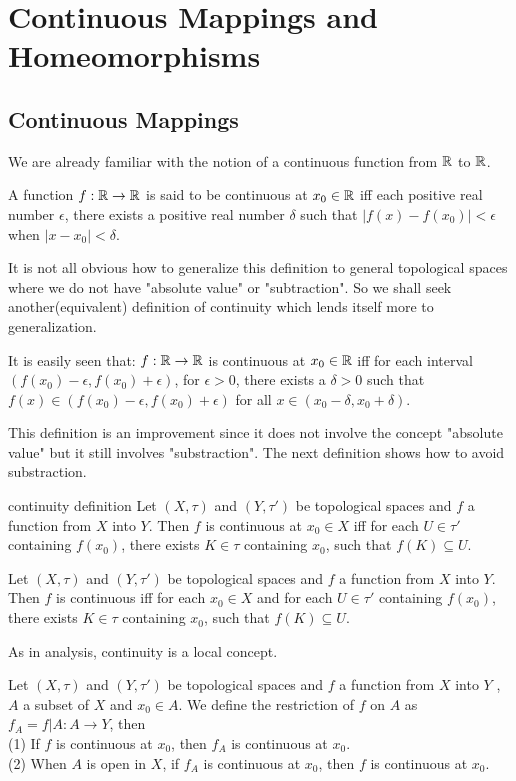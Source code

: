 \chapter{Continuous Mappings and Homeomorphisms}\label{1_2}

\section{Continuous Mappings}
We are already familiar with the notion of a continuous function from $\mathbb{R}$ to $\mathbb{R}$.
\par
A function $f:\mathbb{R}\rightarrow \mathbb{R}$ is said to be continuous at $x_0\in \mathbb{R}$ iff each positive real number $\epsilon$, 
there exists a positive real number $\delta$ such that $|f(x)-f(x_0)|<\epsilon$ when $|x-x_0|<\delta$. 
\par
It is not all obvious how to generalize this definition to general topological spaces where we do not have 
"absolute value" or "subtraction". So we shall seek another(equivalent) definition of continuity which lends itself more to 
generalization. 

It is easily seen that: $f:\mathbb{R}\rightarrow \mathbb{R}$ is continuous at $x_0\in\mathbb{R}$ iff for each interval $(f(x_0)-\epsilon, f(x_0)+\epsilon)$, 
for $\epsilon>0$, there exists a $\delta>0$ such that $f(x)\in(f(x_0)-\epsilon, f(x_0)+\epsilon)$ for all $x\in(x_0-\delta,x_0+\delta)$.
\par
This definition is an improvement since it does not involve the concept "absolute value" but it still involves "substraction". 
The next definition shows how to avoid substraction.

\begin{definition}{}{continuity definition}
    Let $(X,\tau)$ and $(Y,\tau')$ be topological spaces and $f$ a function from $X$ into $Y$.
    Then $f$ is continuous at $x_0\in X$ iff
    for each $U\in \tau'$ containing $f(x_0)$, there exists $K\in\tau$ containing $x_0$, such that $f(K)\subseteq U$.
\end{definition}

\begin{definition}{}{}
    Let $(X,\tau)$ and $(Y,\tau')$ be topological spaces and $f$ a function from $X$ into $Y$.
    Then $f$ is continuous iff for each $x_0\in X$ and for each $U\in \tau'$ containing $f(x_0)$, 
    there exists $K\in\tau$ containing $x_0$, such that $f(K)\subseteq U$.
\end{definition}

As in analysis, continuity is a local concept. 
\begin{proposition}{}{}
    Let $(X,\tau)$ and $(Y,\tau')$ be topological spaces and $f$ a function from $X$ into $Y$ , $A$ a subset of $X$ and $x_0\in A$.
    We define the restriction of $f$ on $A$ as $f_A = f|A:A\rightarrow Y$, then\\
    (1) If $f$ is continuous at $x_0$, then $f_A$ is continuous at $x_0$.\\
    (2) When $A$ is open in $X$, if $f_A$ is continuous at $x_0$, then $f$ is continuous at $x_0$.
\end{proposition}


